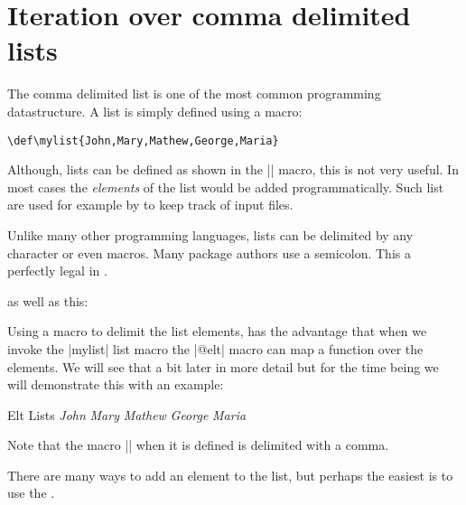 \section{Iteration over comma delimited lists}

The comma delimited list is one of the most common programming datastructure. A list is simply defined using a macro:

\begin{verbatim}
\def\mylist{John,Mary,Mathew,George,Maria}
\end{verbatim}

Although, lists can be defined as shown in the |\mylist| macro, this is not very useful. In most cases the \textit{elements} of the list would be added programmatically. Such list are used for example by \latex to keep track of input files.

Unlike many other programming languages, lists can be delimited by any character or even macros. Many package authors use a semicolon. This a perfectly legal in \tex.

\begin{teXXX}
\end{teXXX}
as well as this:

\begin{teXXX}
\end{teXXX}

\begin{macro}{\@elt}
Using a macro to delimit the list elements, has the advantage that when we invoke the |mylist| list macro the |@elt| macro can map a function over the elements. We will see that a bit later in more detail but for the time being we will demonstrate this with an example:
\end{macro}

\begin{texexample}{Elt Lists}{}
\def\mylist{\@elt John,\@elt Mary,\@elt Mathew, \@elt George, \@elt Maria,}
\def\@elt#1,{\textit{#1} }
\mylist
\end{texexample}

Note that the macro |\@elt| when it is defined is delimited with a comma. 


\begin{macro}{\g@addto@macro}
There are many ways to add an element to the list, but perhaps the easiest is to use the \latex \CMDI{\g@addto@macro}. 
\end{macro}


